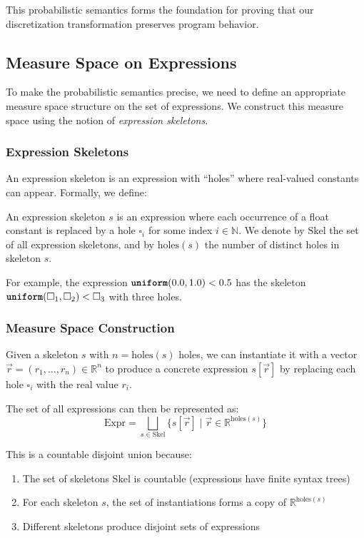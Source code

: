 This probabilistic semantics forms the foundation for proving that our discretization transformation preserves program behavior.

\subsection{Measure Space on Expressions}

To make the probabilistic semantics precise, we need to define an appropriate measure space structure on the set of expressions. We construct this measure space using the notion of \emph{expression skeletons}.

\subsubsection{Expression Skeletons}

An expression skeleton is an expression with ``holes'' where real-valued constants can appear. Formally, we define:

\begin{definition}
An expression skeleton $s$ is an expression where each occurrence of a float constant is replaced by a hole $\square_i$ for some index $i \in \mathbb{N}$. We denote by $\text{Skel}$ the set of all expression skeletons, and by $\text{holes}(s)$ the number of distinct holes in skeleton $s$.
\end{definition}

For example, the expression $\text{\ttfamily\bfseries uniform}(0.0, 1.0) < 0.5$ has the skeleton $\text{\ttfamily\bfseries uniform}(\square_1, \square_2) < \square_3$ with three holes.

\subsubsection{Measure Space Construction}

Given a skeleton $s$ with $n = \text{holes}(s)$ holes, we can instantiate it with a vector $\vec{r} = (r_1, \ldots, r_n) \in \mathbb{R}^n$ to produce a concrete expression $s[\vec{r}]$ by replacing each hole $\square_i$ with the real value $r_i$.

The set of all expressions can then be represented as:
\[
\text{Expr} = \bigsqcup_{s \in \text{Skel}} \{s[\vec{r}] \mid \vec{r} \in \mathbb{R}^{\text{holes}(s)}\}
\]

This is a countable disjoint union because:
\begin{enumerate}
    \item The set of skeletons $\text{Skel}$ is countable (expressions have finite syntax trees)
    \item For each skeleton $s$, the set of instantiations forms a copy of $\mathbb{R}^{\text{holes}(s)}$
    \item Different skeletons produce disjoint sets of expressions
\end{enumerate}

